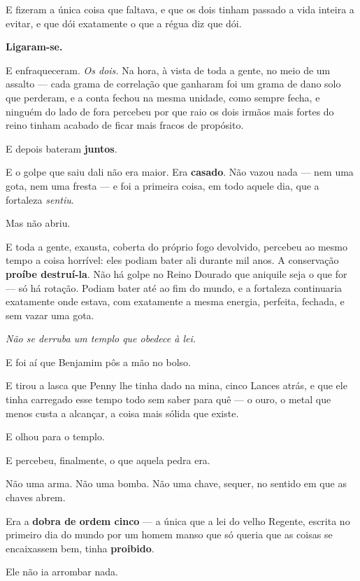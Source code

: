 \documentclass[livro.tex]{subfiles}
\begin{document}
E fizeram a única coisa que faltava, e que os dois tinham passado a vida inteira a evitar, e que dói exatamente o
que a régua diz que dói.

\textbf{Ligaram-se.}

E enfraqueceram. \emph{Os dois.} Na hora, à vista de toda a gente, no meio de um assalto --- cada grama de
correlação que ganharam foi um grama de dano solo que perderam, e a conta fechou na mesma unidade, como sempre
fecha, e ninguém do lado de fora percebeu por que raio os dois irmãos mais fortes do reino tinham acabado de ficar
mais fracos de propósito.

E depois bateram \textbf{juntos}.

E o golpe que saiu dali não era maior. Era \textbf{casado}. Não vazou nada --- nem uma gota, nem uma fresta --- e
foi a primeira coisa, em todo aquele dia, que a fortaleza \emph{sentiu}.

\medskip

Mas não abriu.

E toda a gente, exausta, coberta do próprio fogo devolvido, percebeu ao mesmo tempo a coisa horrível: eles podiam
bater ali durante mil anos. A conservação \textbf{proíbe destruí-la}. Não há golpe no Reino Dourado que aniquile
seja o que for --- só há rotação. Podiam bater até ao fim do mundo, e a fortaleza continuaria exatamente onde
estava, com exatamente a mesma energia, perfeita, fechada, e sem vazar uma gota.

\emph{Não se derruba um templo que obedece à lei.}

\medskip

E foi aí que Benjamim pôs a mão no bolso.

\medskip

E tirou a lasca que Penny lhe tinha dado na mina, cinco Lances atrás, e que ele tinha carregado esse tempo todo sem
saber para quê --- o ouro, o metal que menos custa a alcançar, a coisa mais sólida que existe.

E olhou para o templo.

E percebeu, finalmente, o que aquela pedra era.

Não uma arma. Não uma bomba. Não uma chave, sequer, no sentido em que as chaves abrem.

Era a \textbf{dobra de ordem cinco} --- a única que a lei do velho Regente, escrita no primeiro dia do mundo por um
homem manso que só queria que as coisas se encaixassem bem, tinha \textbf{proibido}.

Ele não ia arrombar nada.
\end{document}
